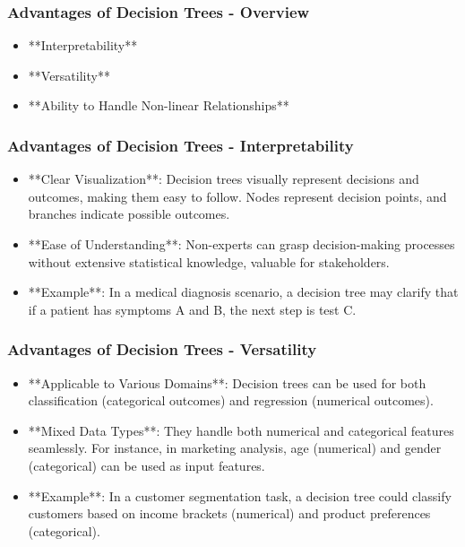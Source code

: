 \documentclass[aspectratio=169]{beamer}
\begin{document}
\begin{frame}[fragile]
    \frametitle{Advantages of Decision Trees - Overview}
    \begin{itemize}
        \item **Interpretability**
        \item **Versatility**
        \item **Ability to Handle Non-linear Relationships**
    \end{itemize}
\end{frame}

\begin{frame}[fragile]
    \frametitle{Advantages of Decision Trees - Interpretability}
    \begin{itemize}
        \item **Clear Visualization**: 
            Decision trees visually represent decisions and outcomes, making them easy to follow. Nodes represent decision points, and branches indicate possible outcomes.
        
        \item **Ease of Understanding**: 
            Non-experts can grasp decision-making processes without extensive statistical knowledge, valuable for stakeholders.
        
        \item **Example**:
            In a medical diagnosis scenario, a decision tree may clarify that if a patient has symptoms A and B, the next step is test C.
    \end{itemize}
\end{frame}

\begin{frame}[fragile]
    \frametitle{Advantages of Decision Trees - Versatility}
    \begin{itemize}
        \item **Applicable to Various Domains**: 
            Decision trees can be used for both classification (categorical outcomes) and regression (numerical outcomes).
        
        \item **Mixed Data Types**: 
            They handle both numerical and categorical features seamlessly. For instance, in marketing analysis, age (numerical) and gender (categorical) can be used as input features.
        
        \item **Example**:
            In a customer segmentation task, a decision tree could classify customers based on income brackets (numerical) and product preferences (categorical).
    \end{itemize}
\end{frame}
\end{document}
